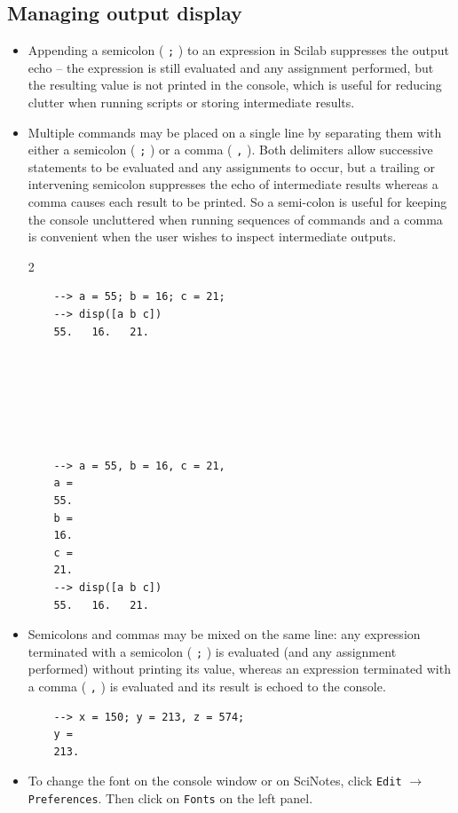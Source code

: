	\subsection{Managing output display}
		\begin{itemize}
			\item Appending a semicolon ( \texttt{;} ) to an expression in Scilab suppresses the output echo -- the expression is still evaluated and any assignment performed, but the resulting value is not printed in the console, which is useful for reducing clutter when running scripts or storing intermediate results.
			
			\item Multiple commands may be placed on a single line by separating them with either a semicolon ( \texttt{;} ) or a comma ( \texttt{,} ). Both delimiters allow successive statements to be evaluated and any assignments to occur, but a trailing or intervening semicolon suppresses the echo of intermediate results whereas a comma causes each result to be printed. So a semi-colon is useful for keeping the console uncluttered when running sequences of commands and a comma is convenient when the user wishes to inspect intermediate outputs.
			\begin{multicols}{2}
\begin{verbatim}
	--> a = 55; b = 16; c = 21;
	--> disp([a b c])
	55.   16.   21.
	
	
	
	
	
	
\end{verbatim}

\begin{verbatim}
	--> a = 55, b = 16, c = 21,
	a =
	55.
	b =
	16.
	c =
	21.
	--> disp([a b c])
	55.   16.   21.
\end{verbatim}
			\end{multicols}
			
			\item Semicolons and commas may be mixed on the same line: any expression terminated with a semicolon ( \texttt{;} ) is evaluated (and any assignment performed) without printing its value, whereas an expression terminated with a comma ( \texttt{,} ) is evaluated and its result is echoed to the console.
\begin{verbatim}
	--> x = 150; y = 213, z = 574;
	y =
	213.
\end{verbatim}
			\item To change the font on the console window or on SciNotes, click \texttt{Edit} $\rightarrow$ \texttt{Preferences}. Then click on \texttt{Fonts} on the left panel.
			

\end{itemize}

